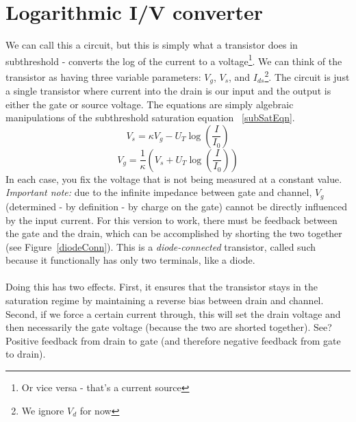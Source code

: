 \documentclass[report]{subfiles}
\begin{document}

\section{Logarithmic I/V converter}
We can call this a circuit, but this is simply what a transistor does in subthreshold - converts the log of the current to a voltage\footnote{Or vice versa - that's a current source}. We can think of the transistor as having three variable parameters: $V_g$, $V_s$, and $I_{ds}$\footnote{We ignore $V_d$ for now}. The circuit is just a single transistor where current into the drain is our input and the output is either the gate or source voltage. The equations are simply algebraic manipulations of the subthreshold saturation equation ~\eqref{subSatEqn}.
\begin{equation}
V_s = \kappa V_g - U_T \log \left(\frac{I}{I_0}\right)
\end{equation}
\begin{equation}
V_g = \frac{1}{\kappa}\left( V_s + U_T \log \left(\frac{I}{I_0}\right) \right)
\end{equation}
In each case, you fix the voltage that is not being measured at a constant value. \emph{Important note:} due to the infinite impedance between gate and channel, $V_g$ (determined  - by definition - by charge on the gate) cannot be directly influenced by the input current. For this version to work, there must be feedback between the gate and the drain, which can be accomplished by shorting the two together (see Figure~\ref{diodeConn}). This is a \emph{diode-connected} transistor, called such because it functionally has only two terminals, like a diode.\\ \\
Doing this has two effects. First, it ensures that the transistor stays in the saturation regime by maintaining a reverse bias between drain and channel. Second, if we force a certain current through, this will set the drain voltage and then necessarily the gate voltage (because the two are shorted together). See? Positive feedback from drain to gate (and therefore negative feedback from gate to drain).
\end{document}
